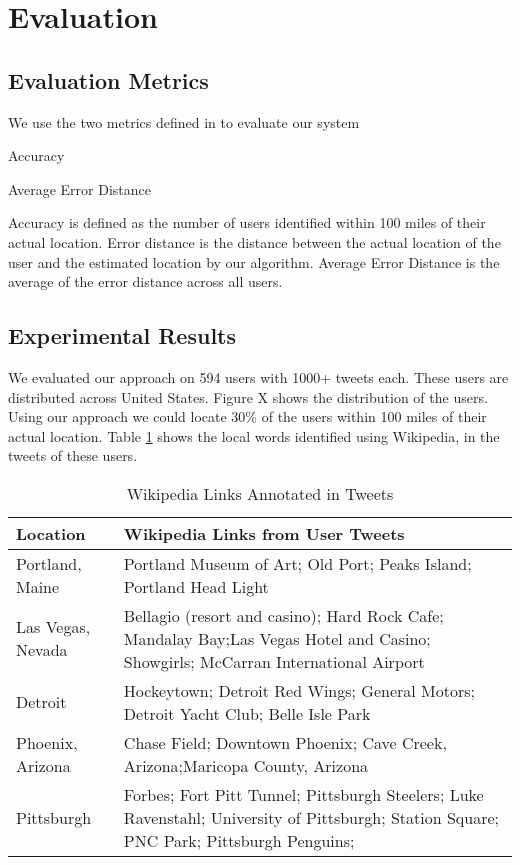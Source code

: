 
\section{Evaluation}
\label{sec:evaluation}

\subsection{Evaluation Metrics}
We use the two metrics defined in \cite{cheng2010you} to evaluate our system \begin{inparaenum}[(1)] \item Accuracy \item Average Error Distance \end{inparaenum}
Accuracy is defined as the number of users identified within 100 miles of their actual location.
Error distance is the distance between the actual location of the user and the estimated location by our algorithm. Average Error Distance is the average of the error distance across all users.

\subsection{Experimental Results}
We evaluated our approach on 594 users with 1000+ tweets each. These users are distributed across United States. Figure X shows the distribution of the users. Using our approach we could locate 30\% of the users within 100 miles of their actual location. Table \ref{table:wikilinks} shows the local words identified using Wikipedia, in the tweets of these users.

\begin{table}
\begin{tabular}{|p{3cm}|p{8cm}|}
\hline
\textbf{Location}&{\textbf{Wikipedia Links from User Tweets}}\\
\hline
{Portland, Maine}&{Portland Museum of Art; Old Port; Peaks Island; Portland Head Light}\\
\hline
{Las Vegas, Nevada}&{Bellagio (resort and casino); Hard Rock Cafe; Mandalay Bay;Las Vegas Hotel and Casino; Showgirls; McCarran International Airport}\\
\hline
{Detroit}&{Hockeytown; Detroit Red Wings; General Motors; Detroit Yacht Club; Belle Isle Park}\\
\hline
{Phoenix, Arizona}&{Chase Field; Downtown Phoenix; Cave Creek, Arizona;Maricopa County, Arizona} \\
\hline
{Pittsburgh}&{Forbes; Fort Pitt Tunnel; Pittsburgh Steelers; Luke Ravenstahl; University of Pittsburgh; Station Square; PNC Park; Pittsburgh Penguins;}\\
\hline
\end{tabular}
\caption{Wikipedia Links Annotated in Tweets}
\label{table:wikilinks}
\end{table}


